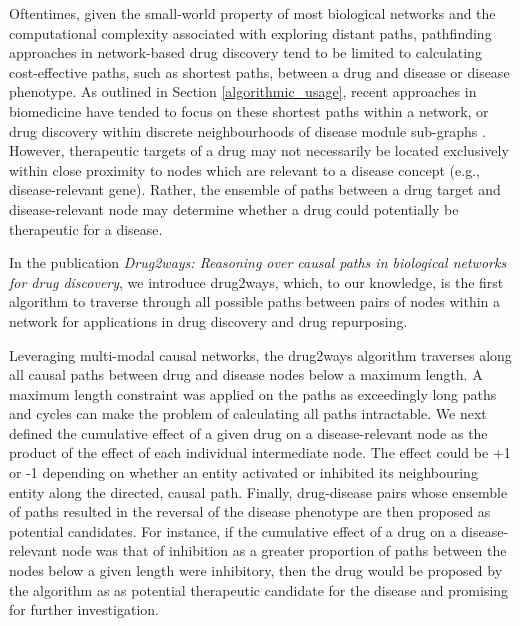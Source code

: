 Oftentimes, given the small-world property of most biological networks and the computational complexity associated with exploring distant paths, pathfinding approaches in network-based drug discovery tend to be limited to calculating cost-effective paths, such as shortest paths, between a drug and disease or disease phenotype. As outlined in Section \ref{algorithmic_usage}, recent approaches in biomedicine have tended to focus on these shortest paths within a network, or drug discovery within discrete neighbourhoods of disease module sub-graphs \parencite{cheng2019}. However, therapeutic targets of a drug may not necessarily be located exclusively within close proximity to nodes which are relevant to a disease concept (e.g., disease-relevant gene). Rather, the ensemble of paths between a drug target and disease-relevant node may determine whether a drug could potentially be therapeutic for a disease.

In the publication \textit{Drug2ways: Reasoning over causal paths in biological networks for drug discovery}, we introduce drug2ways, which, to our knowledge, is the first algorithm to traverse through all possible paths between pairs of nodes within a network for applications in drug discovery and drug repurposing. 

Leveraging multi-modal causal networks, the drug2ways algorithm traverses along all causal paths between drug and disease nodes below a maximum length. A maximum length constraint was applied on the paths as exceedingly long paths and cycles can make the problem of calculating all paths intractable. We next defined the cumulative effect of a given drug on a disease-relevant node as the product of the effect of each individual intermediate node. The effect could be +1 or -1 depending on whether an entity activated or inhibited its neighbouring entity along the directed, causal path. Finally, drug-disease pairs whose ensemble of paths resulted in the reversal of the disease phenotype are then proposed as potential candidates. For instance, if the cumulative effect of a drug on a disease-relevant node was that of inhibition as a greater proportion of paths between the nodes below a given length were inhibitory, then the drug would be proposed by the algorithm as as potential therapeutic candidate for the disease and promising for further investigation. 

